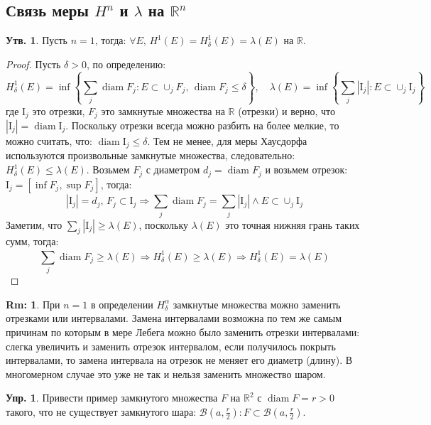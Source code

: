 \documentclass[12pt]{article}
\newcommand{\MR}{\mathbb{R}}
\newcommand{\MI}{\mathrm{I}}
\newcommand{\MB}{\mathcal{B}}
\theoremstyle{definition}
\newtheorem{rem}{Rm:}
\newtheorem{prop}{Утв.}
\newtheorem{exrc}{Упр.}
\DeclareMathOperator{\diam}{\text{diam}}
\newcommand{\ddsum}[2]{\displaystyle\sum\limits_{#1}^{#2}}
\begin{document}
\subsection*{Связь меры $H^n$ и $\lambda$ на $\MR^n$}
\begin{prop}
	Пусть $n = 1$, тогда: $\forall E, \, H^1(E) = H_\delta^1(E) = \lambda(E)$ на $\MR$.
\end{prop}
\begin{proof}
	Пусть $\delta > 0$, по определению:
	$$
		H_\delta^1(E) = \inf\left\{\ddsum{j}{}\diam{F_j} \colon E \subset \cup_j F_j, \, \diam{F_j} \leq \delta\right\}, \quad
		\lambda(E) = \inf\left\{\ddsum{j}{}|\MI_j| \colon E \subset \cup_j \MI_j\right\}
	$$
	где $\MI_j$ это отрезки, $F_j$ это замкнутые множества на $\MR$ (отрезки) и верно, что $|\MI_j| = \diam{\MI_j}$. Поскольку отрезки всегда можно разбить на более мелкие, то можно считать, что: $\diam{\MI_j}\leq \delta$. Тем не менее, для меры Хаусдорфа используются произвольные замкнутые множества, следовательно: $H_\delta^1(E) \leq \lambda(E)$. Возьмем $F_j$ с диаметром $d_j = \diam{F_j}$ и возьмем отрезок: $\MI_j = [\inf{F_j}, \sup{F_j}]$, тогда: 
	$$
		|\MI_j| = d_j, \, F_j \subset \MI_j \Rightarrow \ddsum{j}{}\diam{F_j} = \ddsum{j}{}|\MI_j| \wedge E \subset \cup_j \MI_j
	$$
	Заметим, что $\sum_j |\MI_j| \geq \lambda(E)$, поскольку $\lambda(E)$ это точная нижняя грань таких сумм, тогда:
	$$
		\ddsum{j}{}\diam{F_j} \geq \lambda(E) \Rightarrow H_\delta^1(E) \geq \lambda(E) \Rightarrow H_\delta^1(E) = \lambda(E)
	$$
\end{proof}
\begin{rem}
	При $n = 1$ в определении $H_\delta^\alpha$ замкнутые множества можно заменить отрезками или интервалами. Замена интервалами возможна по тем же самым причинам по которым в мере Лебега можно было заменить отрезки интервалами: слегка увеличить и заменить отрезок интервалом, если получилось покрыть интервалами, то замена интервала на отрезок не меняет его диаметр (длину). В многомерном случае это уже не так и нельзя заменить множество шаром.
\end{rem}
\begin{exrc}
	Привести пример замкнутого множества $F$ на $\MR^2$ с $\diam{F} = r > 0$ такого, что не существует замкнутого шара: $\MB(a,\tfrac{r}{2}) \colon F \subset \MB(a,\tfrac{r}{2})$.
\end{exrc}
\end{document}
